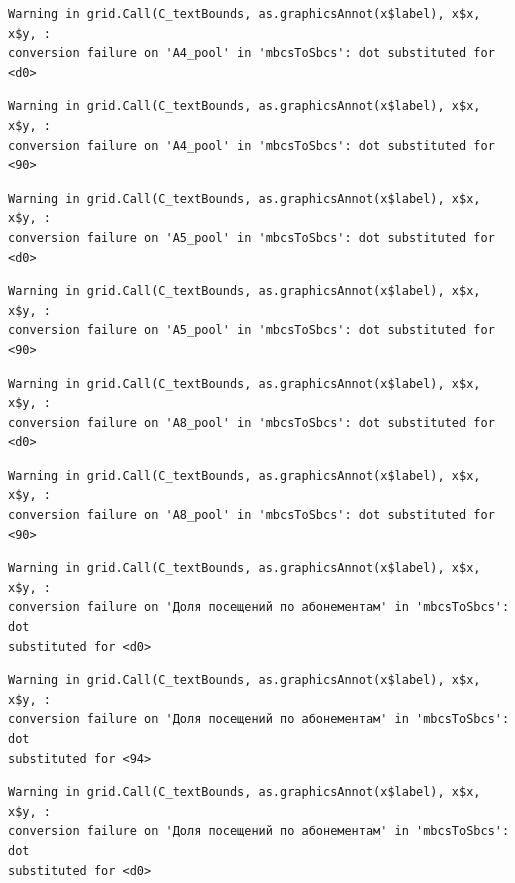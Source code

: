 \documentclass[
  letterpaper,
  DIV=11,
  numbers=noendperiod]{scrartcl}
\begin{document}
\begin{verbatim}
Warning in grid.Call(C_textBounds, as.graphicsAnnot(x$label), x$x, x$y, :
conversion failure on 'А4_pool' in 'mbcsToSbcs': dot substituted for <d0>
\end{verbatim}

\begin{verbatim}
Warning in grid.Call(C_textBounds, as.graphicsAnnot(x$label), x$x, x$y, :
conversion failure on 'А4_pool' in 'mbcsToSbcs': dot substituted for <90>
\end{verbatim}

\begin{verbatim}
Warning in grid.Call(C_textBounds, as.graphicsAnnot(x$label), x$x, x$y, :
conversion failure on 'А5_pool' in 'mbcsToSbcs': dot substituted for <d0>
\end{verbatim}

\begin{verbatim}
Warning in grid.Call(C_textBounds, as.graphicsAnnot(x$label), x$x, x$y, :
conversion failure on 'А5_pool' in 'mbcsToSbcs': dot substituted for <90>
\end{verbatim}

\begin{verbatim}
Warning in grid.Call(C_textBounds, as.graphicsAnnot(x$label), x$x, x$y, :
conversion failure on 'А8_pool' in 'mbcsToSbcs': dot substituted for <d0>
\end{verbatim}

\begin{verbatim}
Warning in grid.Call(C_textBounds, as.graphicsAnnot(x$label), x$x, x$y, :
conversion failure on 'А8_pool' in 'mbcsToSbcs': dot substituted for <90>
\end{verbatim}

\begin{verbatim}
Warning in grid.Call(C_textBounds, as.graphicsAnnot(x$label), x$x, x$y, :
conversion failure on 'Доля посещений по абонементам' in 'mbcsToSbcs': dot
substituted for <d0>
\end{verbatim}

\begin{verbatim}
Warning in grid.Call(C_textBounds, as.graphicsAnnot(x$label), x$x, x$y, :
conversion failure on 'Доля посещений по абонементам' in 'mbcsToSbcs': dot
substituted for <94>
\end{verbatim}

\begin{verbatim}
Warning in grid.Call(C_textBounds, as.graphicsAnnot(x$label), x$x, x$y, :
conversion failure on 'Доля посещений по абонементам' in 'mbcsToSbcs': dot
substituted for <d0>
\end{verbatim}
\end{document}
